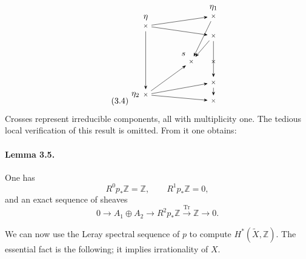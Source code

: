 \documentclass[10pt]{article}
\newcommand{\Z}{\mathbb Z}
\newcommand{\Tr}{\operatorname{Tr}}
\begin{document}
\[
\tag{3.4}
\begin{tikzpicture}[scale=1.02,>=Stealth]
  \tikzset{pt/.style={inner sep=0.5pt,font=\scriptsize}}
  \node[pt,label=above:\(\eta\)] (eta) at (0,1.65) {\(\times\)};
  \node[pt,label=above:\(\eta_1\)] (e11) at (2.75,2.05) {\(\times\)};
  \node[pt] (e12) at (2.75,1.25) {\(\times\)};
  \node[pt,label=left:\(\eta_2\)] (e2) at (0,-1.15) {\(\times\)};
  \node[pt,label=above left:\(s\)] (s0) at (1.85,0.20) {\(\times\)};
  \node[pt] (s1) at (2.75,0.20) {\(\times\)};
  \node[pt] (s2) at (2.75,-0.65) {\(\times\)};
  \node[pt] (s3) at (2.75,-1.40) {\(\times\)};
  \draw[->,shorten >=3pt,shorten <=3pt] (eta)--(e11);
  \draw[->,shorten >=3pt,shorten <=3pt] (eta)--(e12);
  \draw[->,shorten >=3pt,shorten <=3pt] (eta)--(e2);
  \draw[->,shorten >=3pt,shorten <=3pt] (e2)--(s0);
  \draw[->,shorten >=3pt,shorten <=3pt] (e2)--(s2);
  \draw[->,shorten >=3pt,shorten <=3pt] (e2)--(s3);
  \draw[->,shorten >=3pt,shorten <=3pt] (e11)--(s0);
  \draw[->,shorten >=3pt,shorten <=3pt] (e12)--(s0);
  \draw[->,shorten >=3pt,shorten <=3pt] (e12)--(s2);
  \draw[->,shorten >=3pt,shorten <=3pt] (s2)--(s3);
\end{tikzpicture}
\]
Crosses represent irreducible components, all with multiplicity one. The tedious local verification of this result is omitted. From it one obtains:
\paragraph{Lemma 3.5.} One has
\[
R^0p_*\Z=\Z,
\qquad R^1p_*\Z=0,
\]
and an exact sequence of sheaves
\[
0\longrightarrow A_1\oplus A_2\longrightarrow R^2p_*\Z\xrightarrow{\Tr}\Z\longrightarrow0.
\]

We can now use the Leray spectral sequence of \(p\) to compute \(H^*(\widetilde X,\Z)\). The essential fact is the following; it implies irrationality of \(X\).
\end{document}
